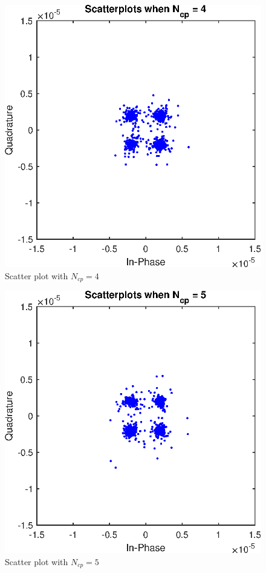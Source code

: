 \documentclass[conference]{IEEEtran}
\begin{document}
\begin{appendices}
\begin{figure}[H]
    \centering
    \includegraphics[width=\linewidth]{images/scatter_Ncp4.eps}
    \caption{Scatter plot with $N_{cp} = 4$}
    \label{Ncp4}
\end{figure}

\begin{figure}[H]
    \centering
    \includegraphics[width=\linewidth]{images/scatter_Ncp5.eps}
    \caption{Scatter plot with $N_{cp} = 5$}
    \label{Ncp5}
\end{figure}



\end{appendices}
\end{document}
